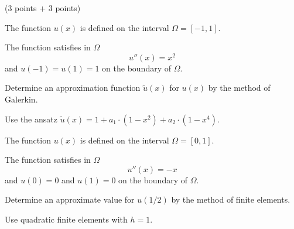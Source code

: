 (3 points + 3 points)
\begin{teilaufgaben}
\item
The function $u(x)$ is defined on the interval $\Omega = [-1, 1].$

The function satisfies in $\Omega$ 
\[
u''(x) = x^2
\]
and $u(-1) = u(1) = 1$ on the boundary of $\Omega$.

Determine an approximation function $\tilde u(x)$ for $u(x)$ by
the method of Galerkin. 

Use the ansatz $\tilde u(x) = 1 + a_1 \cdot (1-x^2) + a_2 \cdot (1-x^4).$

\item
The function $u(x)$ is defined on the interval $\Omega = [0, 1].$

The function satisfies in $\Omega$ 
\[
u''(x) = - x
\]
and $u(0) = 0$ and $u(1) = 0$ on the boundary of $\Omega$.  

Determine an approximate value for $u(1/2)$ by the method of finite elements.

Use quadratic finite elements with $h = 1$.
\end{teilaufgaben}

